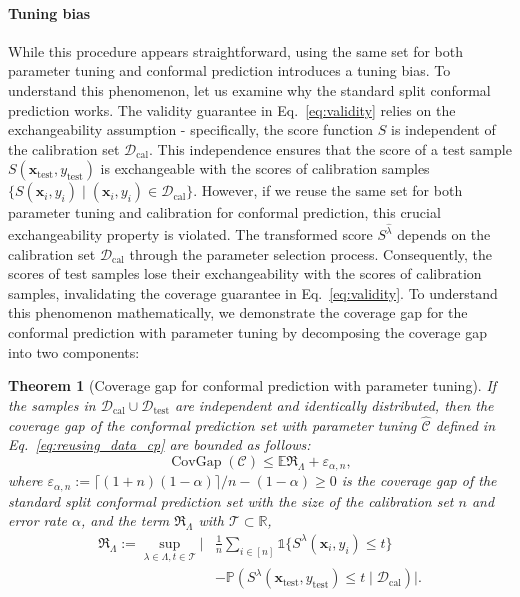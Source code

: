 \documentclass{article}
\renewcommand{\P}{\mathbb{P}}
\newcommand{\E}{\mathbb{E}}
\newcommand{\C}{\mathcal{C}}
\newcommand{\1}{\mathbbm{1}}
\newcommand{\Eqref}[1]{Eq.~\eqref{#1}}
\newcommand{\id}[1]{\mathds{1}\{#1\}}
\newcommand{\CovGap}{\mathop{\text{CovGap}}}
\newcommand{\of}[1]{\left(#1\right)}
\theoremstyle{plain}
\newtheorem{theorem}{Theorem}[section]
\theoremstyle{definition}
\theoremstyle{remark}
\begin{document}
\paragraph{Tuning bias} 
While this procedure appears straightforward, using the same set for both parameter tuning and conformal prediction introduces a tuning bias.
To understand this phenomenon, let us examine why the standard split conformal prediction works. 
The validity guarantee in \Eqref{eq:validity} relies on the exchangeability assumption - specifically, the score function $S$ is independent of the calibration set $\mathcal{D}_{\text{cal}}$. 
This independence ensures that the score of a test sample $S(\boldsymbol{x}_{\text{test}}, y_{\text{test}})$ is exchangeable with the scores of calibration samples $\{S(\boldsymbol{x}_i, y_i) \mid (\boldsymbol{x}_i, y_i) \in \mathcal{D}_{\text{cal}}\}$.
However, if we reuse the same set for both parameter tuning and calibration for conformal prediction, this crucial exchangeability property is violated. 
The transformed score $S^{\hat{\lambda}}$ depends on the calibration set $\mathcal{D}_{\text{cal}}$ through the parameter selection process.
Consequently, the scores of test samples lose their exchangeability with the scores of calibration samples, invalidating the coverage guarantee in \Eqref{eq:validity}.
To understand this phenomenon mathematically, we demonstrate the coverage gap for the conformal prediction with parameter tuning by decomposing the coverage gap into two components:
\begin{theorem}[Coverage gap for conformal prediction with parameter tuning]
\label{thm:tuning_bias}
    If the samples in $\mathcal{D}_{\text{cal}} \cup \mathcal{D}_{\text{test}}$ are independent and identically distributed, then the coverage gap of the conformal prediction set with parameter tuning $\widehat{\C}$ defined in \Eqref{eq:reusing_data_cp} are bounded as follows:
    \begin{equation*}
        \CovGap({\C}) \leq \E \mathfrak{R}_{\Lambda} + \varepsilon_{\alpha, n},
    \end{equation*}
    where \(\varepsilon_{\alpha, n}:= \lceil (1+n) (1-\alpha) \rceil/n - (1-\alpha) \geq 0\) is the coverage gap of the standard split conformal prediction set with the size of the calibration set $n$ and error rate $\alpha$, and the term \(\mathfrak{R}_{\Lambda}\) with $\mathcal{T} \subset \mathbb{R}$,
    \begin{equation*}
        \begin{aligned}
            \mathfrak{R}_{\Lambda} := 
            \sup_{\lambda \in \Lambda, t \in \mathcal{T}} \Big|
                & \frac{1}{n} \sum_{i \in [n]} \id{S^{\lambda}(\boldsymbol{x}_i, y_i) \leq t} \\
                & - \P\of{S^{\lambda}(\boldsymbol{x}_{\text{test}}, y_{\text{test}})\leq t \mid \mathcal{D}_{\text{cal}}}
            \Big|.
        \end{aligned}
    \end{equation*} 
    
\end{theorem}
\end{document}
